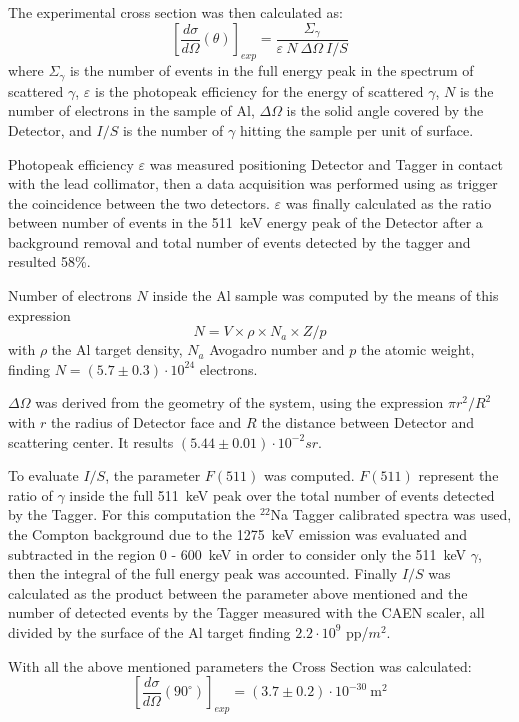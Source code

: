 The experimental cross section was then calculated as:
\begin{equation*}
	\left[\frac{d\sigma}{d\Omega}(\theta)\right]_{exp}=\frac{\Sigma_\gamma}{\varepsilon\ N\ \Delta\Omega\ I/S}
\end{equation*}
 where $\Sigma_\gamma$ is the number of events in the full energy peak in the spectrum of scattered $\gamma$, $\varepsilon$ is the photopeak efficiency for the energy of scattered  $\gamma$, $N$ is the number of electrons in the sample of Al, $\Delta\Omega$ is the solid angle covered by the Detector, and $I/S$ is the number of $\gamma$ hitting the sample per unit of surface. 
 
 Photopeak efficiency $\varepsilon$ was measured positioning Detector and Tagger in contact with the lead collimator, then a data acquisition was performed using as trigger the coincidence between the two detectors.
 $\varepsilon$ was finally calculated as the ratio between number of events in the 511~keV energy peak of the Detector after a background removal and total number of events detected by the tagger and resulted 58\%.
 
 Number of electrons $N$ inside the Al sample was computed by the means of this expression 
\[
N=V\times \rho\times N_a\times Z/p
\]
with $\rho$ the Al target density, $N_a$ Avogadro number and $p$  the atomic weight, finding $N=(5.7 \pm 0.3)\cdot10^{24}$ electrons.
 
  $\Delta\Omega$ was derived from the geometry of the system, using the expression $\pi r^2/R^2$ with $r$ the radius of Detector face and $R$ the distance between Detector and scattering center. It results $(5.44\pm0.01)\cdot 10^{-2} sr$. 
  
  To evaluate $I/S$, the parameter $F(511)$ was computed. $F(511)$ represent the ratio of $\gamma$ inside the full 511~keV peak over the total number of events detected by the Tagger. For this computation the $^{22}$Na Tagger calibrated spectra was used, the Compton background due to the 1275~keV emission was evaluated and subtracted in the region 0 - 600~keV in order to consider only the 511~keV $\gamma$, then the integral of the full energy peak was accounted. Finally $I/S$ was calculated as the product between the parameter above mentioned and the number of detected events by the Tagger measured with the CAEN scaler, all divided by the surface of the Al target finding $2.2\cdot10^{9}$ pp/$m^2$.
  
  With all the above mentioned parameters the Cross Section was calculated:
  \begin{equation*}
  	\left[\frac{d\sigma}{d\Omega}(90^{\circ})\right]_{exp}=(3.7\pm0.2)\cdot 10^{-30}\ \text{m}^{2}
  \end{equation*}
  
  
 
